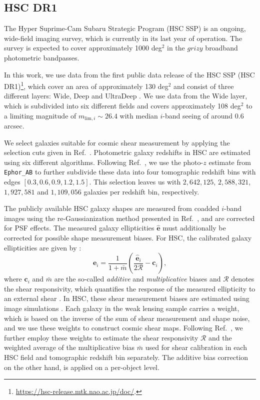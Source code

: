 \documentclass[a4paper,11pt]{article}
\newcommand{\ellip}{\boldsymbol{e}}
\begin{document}
    \subsection{HSC DR1}\label{ssec:data.hsc}
      The Hyper Suprime-Cam Subaru Strategic Program (HSC SSP) is an ongoing, wide-field imaging survey, which is currently in its last year of operation. The survey is expected to cover approximately 1000 deg$^{2}$ in the $grizy$ broadband photometric bandpasses.
    
      In this work, we use data from the first public data release of the HSC SSP (HSC DR1)\footnote{\url{https://hsc-release.mtk.nao.ac.jp/doc/}.}, which cover an area of approximately 130 deg$^2$ and consist of three different layers: Wide, Deep and UltraDeep \cite{1702.08449}. We use data from the Wide layer, which is subdivided into six different fields and covers approximately 108 deg$^2$ to a limiting magnitude of $m_{\mathrm{lim}, i} \sim 26.4$ with median $i$-band seeing of around 0.6 arcsec.
    
      We select galaxies suitable for cosmic shear measurement by applying the selection cuts given in Ref.~\cite{1705.06745}. Photometric galaxy redshifts in HSC are estimated using six different algorithms. Following Ref.~\cite{1809.09148}, we use the photo-$z$ estimate from \texttt{Ephor\_AB} to further subdivide these data into four tomographic redshift bins with edges $[0.3, 0.6, 0.9, 1.2, 1.5]$. This selection leaves us with $2{,}642{,}125$, $2{,}588{,}321$, $1{,}927{,}581$ and $1{,}109{,}056$ galaxies per redshift bin, respectively.
 
      The publicly available HSC galaxy shapes are measured from coadded $i$-band images using the re-Gaussianization method presented in Ref.~\cite{astro-ph/0301054}, and are corrected for PSF effects. The measured galaxy ellipticities $\hat{\ellip}$ must additionally be corrected for possible shape measurement biases. For HSC, the calibrated galaxy ellipticities are given by \cite{1705.06745}:
      \begin{equation}\label{eq:hsc:ecal}
        \ellip_i=\frac{1}{1+\bar{m}}\left(\frac{\hat{\ellip}_{i}}{2 \mathcal{R}}-\boldsymbol{c}_i\right),
      \end{equation}
      where $\boldsymbol{c}_{i}$ and $\bar{m}$ are the so-called \emph{additive} and \emph{multiplicative} biases and $\mathcal{R}$ denotes the shear responsivity, which quantifies the response of the measured ellipticity to an external shear \cite{astro-ph/9411005, astro-ph/0107431}. In HSC, these shear measurement biases are estimated using image simulations \cite{1710.00885}. Each galaxy in the weak lensing sample carries a weight, which is based on the inverse of the sum of shear measurement and shape noise, and we use these weights to construct cosmic shear maps. Following Ref.~\cite{1705.06745}, we further employ these weights to estimate the shear responsivity $\mathcal{R}$ and the weighted average of the multiplicative bias $\bar{m}$ used for shear calibration in each HSC field and tomographic redshift bin separately. The additive bias correction on the other hand, is applied on a per-object level.
   
\end{document}
